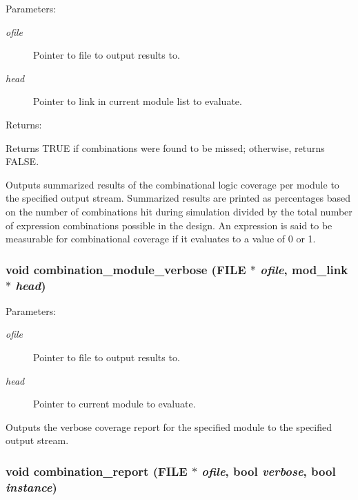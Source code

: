 \begin{Desc}
\item[Parameters: ]\par
\begin{description}
\item[{\em 
ofile}]Pointer to file to output results to. \item[{\em 
head}]Pointer to link in current module list to evaluate.\end{description}
\end{Desc}
\begin{Desc}
\item[Returns: ]\par
Returns TRUE if combinations were found to be missed; otherwise, returns FALSE.\end{Desc}
Outputs summarized results of the combinational logic coverage per module to the specified output stream. Summarized results are printed as  percentages based on the number of combinations hit during simulation  divided by the total number of expression combinations possible in the  design. An expression is said to be measurable for combinational coverage  if it evaluates to a value of 0 or 1. 
\subsubsection{\setlength{\rightskip}{0pt plus 5cm}void combination\_\-module\_\-verbose (FILE $\ast$ {\em ofile}, {\bf mod\_\-link} $\ast$ {\em head})}\label{comb_8c_a14}


\begin{Desc}
\item[Parameters: ]\par
\begin{description}
\item[{\em 
ofile}]Pointer to file to output results to. \item[{\em 
head}]Pointer to current module to evaluate.\end{description}
\end{Desc}
Outputs the verbose coverage report for the specified module to the specified output stream. 
\subsubsection{\setlength{\rightskip}{0pt plus 5cm}void combination\_\-report (FILE $\ast$ {\em ofile}, {\bf bool} {\em verbose}, {\bf bool} {\em instance})}\label{comb_8c_a15}


